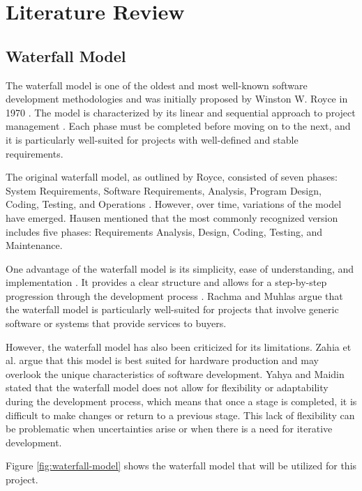 \chapter{Literature Review}
\label{chapter:literature-review}

\section{Waterfall Model}
\label{sec:waterfall-model}

The waterfall model is one of the oldest and most well-known software development methodologies and was initially proposed by Winston W. Royce in 1970 \cite{royce70}. The model is characterized by its linear and sequential approach to project management \cite{Novianti2023}. Each phase must be completed before moving on to the next, and it is particularly well-suited for projects with well-defined and stable requirements.

The original waterfall model, as outlined by Royce, consisted of seven phases: System Requirements, Software Requirements, Analysis, Program Design, Coding, Testing, and Operations \cite{royce70}. However, over time, variations of the model have emerged. Hausen \cite{Hausen} mentioned that the most commonly recognized version includes five phases: Requirements Analysis, Design, Coding, Testing, and Maintenance.

One advantage of the waterfall model is its simplicity, ease of understanding, and implementation \cite{Sunardi2020}. It provides a clear structure and allows for a step-by-step progression through the development process \cite{Sunardi2020}. Rachma and Muhlas \cite{Rachma2022} argue that the waterfall model is particularly well-suited for projects that involve generic software or systems that provide services to buyers.

However, the waterfall model has also been criticized for its limitations. Zahia et al. \cite{Zahia14} argue that this model is best suited for hardware production and may overlook the unique characteristics of software development. Yahya and Maidin \cite{Yahya2023} stated that the waterfall model does not allow for flexibility or adaptability during the development process, which means that once a stage is completed, it is difficult to make changes or return to a previous stage. This lack of flexibility can be problematic when uncertainties arise or when there is a need for iterative development.

Figure \ref{fig:waterfall-model} shows the waterfall model that will be utilized for this project.

